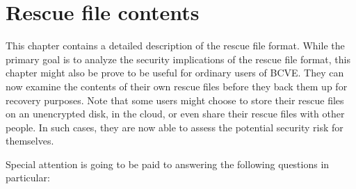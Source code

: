 \documentclass[thesis=B,english]{FITthesis}[2012/10/20]
\begin{document}
	\chapter{Rescue file contents}
	\label{ch:third}
	
	This chapter contains a detailed description of the rescue file format. While the primary goal is to analyze the security implications of the rescue file format, this chapter might also be prove to be useful for ordinary users of BCVE. They can now examine the contents of their own rescue files before they back them up for recovery purposes. Note that some users might choose to store their rescue files on an unencrypted disk, in the cloud, or even share their rescue files with other people. In such cases, they are now able to assess the potential security risk for themselves.
	
	Special attention is going to be paid to answering the following questions in particular:
	
\end{document}

